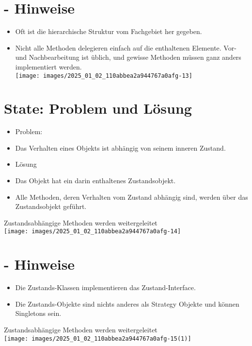 \documentclass[10pt]{article}
\begin{document}
\section*{- Hinweise}
\begin{itemize}
  \item Oft ist die hierarchische Struktur vom Fachgebiet her gegeben.
  \item Nicht alle Methoden delegieren einfach auf die enthaltenen Elemente. Vor- und Nachbearbeitung ist üblich, und gewisse Methoden müssen ganz anders implementiert werden.\\
\texttt{[image: images/2025\_01\_02\_110abbea2a944767a0afg-13]}
\end{itemize}

\section*{State: Problem und Lösung}
\begin{itemize}
  \item Problem:
  \item Das Verhalten eines Objekts ist abhängig von seinem inneren Zustand.
  \item Lösung
  \item Das Objekt hat ein darin enthaltenes Zustandsobjekt.
  \item Alle Methoden, deren Verhalten vom Zustand abhängig sind, werden über das Zustandsobjekt geführt.
\end{itemize}

Zustandsabhängige Methoden werden weitergeleitet\\
\texttt{[image: images/2025\_01\_02\_110abbea2a944767a0afg-14]}

\section*{- Hinweise}
\begin{itemize}
  \item Die Zustands-Klassen implementieren das Zustand-Interface.
  \item Die Zustands-Objekte sind nichts anderes als Strategy Objekte und können Singletons sein.
\end{itemize}

Zustandsabhängige Methoden werden weitergeleitet\\
\texttt{[image: images/2025\_01\_02\_110abbea2a944767a0afg-15(1)]}
\end{document}
